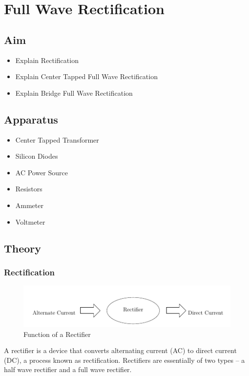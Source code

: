 \chapter{Full Wave Rectification}
	\section{Aim}
		\begin{itemize}
			\tightlist
			\item Explain Rectification
			\item Explain Center Tapped Full Wave Rectification
			\item Explain Bridge Full Wave Rectification
		\end{itemize}
	
	\section{Apparatus}
		\begin{itemize}
			\tightlist
			\item Center Tapped Transformer
			\item Silicon Diodes
			\item AC Power Source
			\item Resistors
			\item Ammeter
			\item Voltmeter
		\end{itemize}
	
	\section{Theory}
		\subsection{Rectification}
			\begin{figure}[h]
				\centering
				\includegraphics[width=0.9\linewidth]{img/exp7/1}
				\caption{Function of a Rectifier}
				\label{fig:rffwR}
			\end{figure}
			A rectifier is a device that converts alternating current (AC) to direct current (DC), a process known as rectification. Rectifiers are essentially of two types – a half wave rectifier and a full wave rectifier.
		
